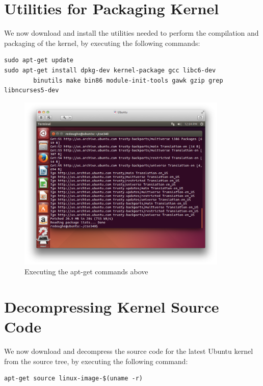\documentclass[12pt]{article}
\newcommand{\imagesize}{100mm}
\begin{document}
\newpage

\section{Utilities for Packaging Kernel}
We now download and install the utilities needed to perform the compilation and packaging of the kernel, by executing the following commands:

\begin{verbatim}
sudo apt-get update
sudo apt-get install dpkg-dev kernel-package gcc libc6-dev 
        binutils make bin86 module-init-tools gawk gzip grep libncurses5-dev
\end{verbatim}

\begin{figure}
\centering
\includegraphics[width=\imagesize]{5.jpg}
\caption{Executing the apt-get commands above}
\end{figure}

\newpage

\section{Decompressing Kernel Source Code}
We now download and decompress the source code for the latest Ubuntu kernel from the source tree, by executing the following command:

\begin{verbatim}
apt-get source linux-image-$(uname -r)
\end{verbatim}
\end{document}
